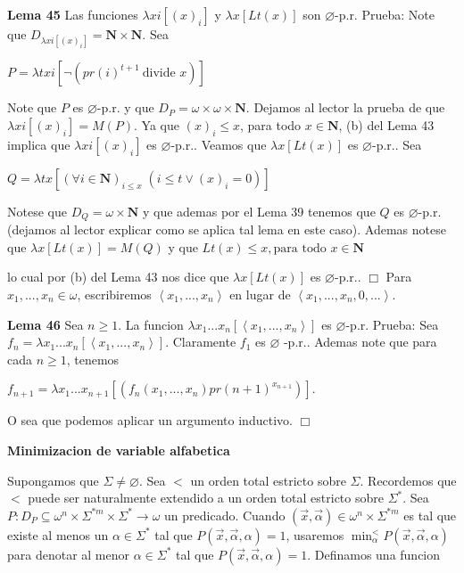 \textbf{Lema 45} Las funciones \(\lambda xi\left[ (x)_{i}\right] \) y \(\lambda x\left[ Lt(x) \right] \) son \(\varnothing \)-p.r.
Prueba: Note que \(D_{\lambda xi\left[ (x)_{i}\right] }=\mathbf{N}\times \mathbf{N}\). Sea

\(\displaystyle P=\lambda txi\left[ \lnot (pr(i)^{t+1}\ \text{divide }x)\right] \)

Note que \(P\) es \(\varnothing \)-p.r. y que \(D_{P}=\omega \times \omega \times \mathbf{N}\). Dejamos al lector la prueba de que \(\lambda xi\left[ (x)_{i} \right] =M(P)\). Ya que \((x)_{i}\leq x\), para todo \(x\in \mathbf{N}\), (b) del Lema 43 implica que \(\lambda xi\left[ (x)_{i}\right] \) es \( \varnothing \)-p.r..
Veamos que \(\lambda x\left[ Lt(x)\right] \) es \(\varnothing \)-p.r.. Sea

\(\displaystyle Q=\lambda tx\left[ (\forall i\in \mathbf{N})_{i\leq x}\;(i\leq t\vee (x)_{i}=0)\right] \)

Notese que \(D_{Q}=\omega \times \mathbf{N}\) y que ademas por el Lema 39 tenemos que \(Q\) es \(\varnothing \)-p.r. (dejamos al lector explicar como se aplica tal lema en este caso). Ademas notese que \(\lambda x \left[ Lt(x)\right] =M(Q)\) y que
\(\displaystyle Lt(x)\leq x,\text{para todo }x\in \mathbf{N} \)

lo cual por (b) del Lema 43 nos dice que \(\lambda x\left[ Lt(x)\right] \) es \(\varnothing \)-p.r.. \(\Box\)
Para \(x_{1},...,x_{n}\in \omega \), escribiremos \(\left\langle x_{1},...,x_{n}\right\rangle \) en lugar de \(\left\langle x_{1},...,x_{n},0,...\right\rangle \).



\textbf{Lema 46} Sea \(n\geq 1\). La funcion \(\lambda x_{1}...x_{n}\left[ \left\langle x_{1},...,x_{n}\right\rangle \right] \) es \(\varnothing \)-p.r.
Prueba: Sea \(f_{n}=\lambda x_{1}...x_{n}\left[ \left\langle x_{1},...,x_{n}\right\rangle \right] \). Claramente \(f_{1}\) es \(\varnothing \) -p.r.. Ademas note que para cada \(n\geq 1\), tenemos

\(\displaystyle f_{n+1}=\lambda x_{1}...x_{n+1}\left[ \left( f_{n}(x_{1},...,x_{n})pr(n+1)^{x_{n+1}}\right) \right] \text{.} \)

O sea que podemos aplicar un argumento inductivo. \(\Box\)



\textbf{Minimizacion de variable alfabetica}

Supongamos que \(\Sigma \neq \varnothing \). Sea \(< \) un orden total estricto sobre \(\Sigma .\) Recordemos que \(< \) puede ser naturalmente extendido a un orden total estricto sobre \(\Sigma ^{\ast }.\) Sea \(P:D_{P}\subseteq \omega ^{n}\times \Sigma ^{\ast m}\times \Sigma ^{\ast }\rightarrow \omega \) un predicado. Cuando \((\vec{x},\vec{\alpha})\in \omega ^{n}\times \Sigma ^{\ast m}\) es tal que existe al menos un \(\alpha \in \Sigma ^{\ast }\) tal que \(P( \vec{x},\vec{\alpha},\alpha )=1\), usaremos \(\min_{\alpha }^{< }P(\vec{x},\vec{ \alpha},\alpha )\) para denotar al menor \(\alpha \in \Sigma ^{\ast }\) tal que \(P(\vec{x},\vec{\alpha},\alpha )=1\). Definamos una funcion

